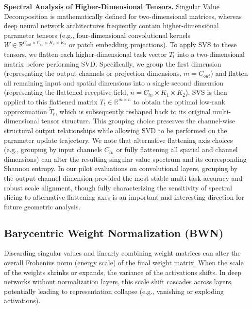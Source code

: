 \textbf{Spectral Analysis of Higher-Dimensional Tensors.} Singular Value Decomposition is mathematically defined for two-dimensional matrices, whereas deep neural network architectures frequently contain higher-dimensional parameter tensors (e.g., four-dimensional convolutional kernels $W \in \mathbb{R}^{C_{out} \times C_{in} \times K_1 \times K_2}$ or patch embedding projections). To apply SVS to these tensors, we flatten each higher-dimensional task vector $T_t$ into a two-dimensional matrix before performing SVD. Specifically, we group the first dimension (representing the output channels or projection dimensions, $m = C_{out}$) and flatten all remaining input and spatial dimensions into a single second dimension (representing the flattened receptive field, $n = C_{in} \times K_1 \times K_2$). SVS is then applied to this flattened matrix $T_t \in \mathbb{R}^{m \times n}$ to obtain the optimal low-rank approximation $\tilde{T}_t$, which is subsequently reshaped back to its original multi-dimensional tensor structure. This grouping choice preserves the channel-wise structural output relationships while allowing SVD to be performed on the parameter update trajectory. We note that alternative flattening axis choices (e.g., grouping by input channels $C_{in}$ or fully flattening all spatial and channel dimensions) can alter the resulting singular value spectrum and its corresponding Shannon entropy. In our pilot evaluations on convolutional layers, grouping by the output channel dimension provided the most stable multi-task accuracy and robust scale alignment, though fully characterizing the sensitivity of spectral slicing to alternative flattening axes is an important and interesting direction for future geometric analysis.

\subsection{Barycentric Weight Normalization (BWN)}
Discarding singular values and linearly combining weight matrices can alter the overall Frobenius norm (energy scale) of the final weight matrix. When the scale of the weights shrinks or expands, the variance of the activations shifts. In deep networks without normalization layers, this scale shift cascades across layers, potentially leading to representation collapse (e.g., vanishing or exploding activations).

